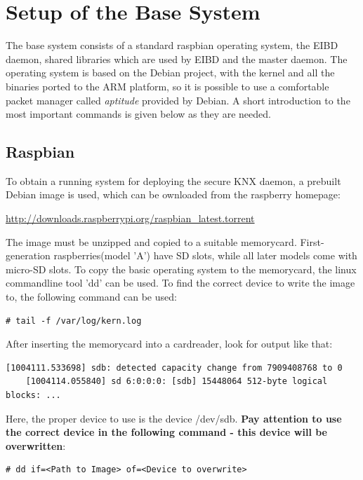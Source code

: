 

\section{Setup of the Base System}

The base system consists of a standard raspbian operating system, the EIBD daemon, shared libraries which are used by EIBD and the master daemon.
The operating system is based on the Debian project, with the kernel and all the binaries ported to the ARM platform, so it is possible to use a
comfortable packet manager called
\textit{aptitude} provided by Debian. A short introduction to the most important commands is given below as they are needed.

\subsection{Raspbian}

To obtain a running system for deploying the secure KNX daemon, a prebuilt Debian image is used, which can be ownloaded from the raspberry homepage:

\url{http://downloads.raspberrypi.org/raspbian_latest.torrent}

The image must be unzipped and copied to a suitable memorycard. First-generation raspberries(model 'A') have SD slots, while
all later models come with micro-SD slots. To copy the basic operating system to the memorycard, the linux commandline tool 'dd' can
be used. To find the correct device to write the image to, the following command can be used: 

\begin{lstlisting}[style=BashInputStyle,label=lst:kern.log]
    # tail -f /var/log/kern.log
\end{lstlisting}

After inserting the memorycard into a cardreader, look for output like that:

\begin{lstlisting}[style=BashInputStyle]
    [1004111.533698] sdb: detected capacity change from 7909408768 to 0
    [1004114.055840] sd 6:0:0:0: [sdb] 15448064 512-byte logical blocks: ...
\end{lstlisting}

Here, the proper device to use is the device /dev/sdb.
\textbf{Pay attention to use the correct device in the following command - this device will be overwritten}:

\begin{lstlisting}[style=BashInputStyle]
    # dd if=<Path to Image> of=<Device to overwrite>
\end{lstlisting}

